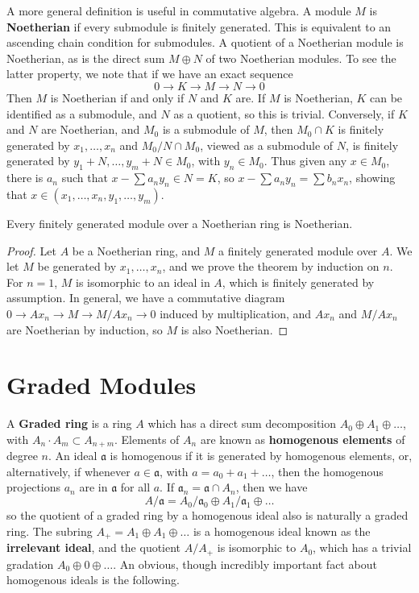 A more general definition is useful in commutative algebra. A module $M$ is {\bf Noetherian} if every submodule is finitely generated. This is equivalent to an ascending chain condition for submodules. A quotient of a Noetherian module is Noetherian, as is the direct sum $M \oplus N$ of two Noetherian modules. To see the latter property, we note that if we have an exact sequence
%
\[ 0 \to K \to M \to N \to 0 \]
%
Then $M$ is Noetherian if and only if $N$ and $K$ are. If $M$ is Noetherian, $K$ can be identified as a submodule, and $N$ as a quotient, so this is trivial. Conversely, if $K$ and $N$ are Noetherian, and $M_0$ is a submodule of $M$, then $M_0 \cap K$ is finitely generated by $x_1, \dots, x_n$ and $M_0/N \cap M_0$, viewed as a submodule of $N$, is finitely generated by $y_1 + N, \dots, y_m + N \in M_0$, with $y_n \in M_0$. Thus given any $x \in M_0$, there is $a_n$ such that $x - \sum a_ny_n \in N = K$, so $x - \sum a_ny_n = \sum b_nx_n$, showing that $x \in (x_1, \dots, x_n, y_1, \dots, y_m)$.

\begin{theorem}
    Every finitely generated module over a Noetherian ring is Noetherian.
\end{theorem}
\begin{proof}
    Let $A$ be a Noetherian ring, and $M$ a finitely generated module over $A$. We let $M$ be generated by $x_1, \dots, x_n$, and we prove the theorem by induction on $n$. For $n = 1$, $M$ is isomorphic to an ideal in $A$, which is finitely generated by assumption. In general, we have a commutative diagram $0 \to Ax_n \to M \to M/Ax_n \to 0$ induced by multiplication, and $Ax_n$ and $M/Ax_n$ are Noetherian by induction, so $M$ is also Noetherian.
\end{proof}

\chapter{Graded Modules}

A {\bf Graded ring} is a ring $A$ which has a direct sum decomposition $A_0 \oplus A_1 \oplus \dots$, with $A_n \cdot A_m \subset A_{n + m}$. Elements of $A_n$ are known as {\bf homogenous elements} of degree $n$. An ideal $\mathfrak{a}$ is homogenous if it is generated by homogenous elements, or, alternatively, if whenever $a \in \mathfrak{a}$, with $a = a_0 + a_1 + \dots$, then the homogenous projections $a_n$ are in $\mathfrak{a}$ for all $a$. If $\mathfrak{a}_n = \mathfrak{a} \cap A_n$, then we have
%
\[ A/\mathfrak{a} = A_0/\mathfrak{a}_0 \oplus A_1/\mathfrak{a}_1 \oplus \dots \]
%
so the quotient of a graded ring by a homogenous ideal also is naturally a graded ring. The subring $A_+ = A_1 \oplus A_1 \oplus \dots$ is a homogenous ideal known as the {\bf irrelevant ideal}, and the quotient $A/A_+$ is isomorphic to $A_0$, which has a trivial gradation $A_0 \oplus 0 \oplus \dots$. An obvious, though incredibly important fact about homogenous ideals is the following.

